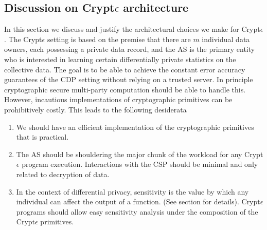 \subsection{Discussion on Crypt$\epsilon$ architecture}
In this section we discuss and justify the architectural choices we make for Crypt$\epsilon$. The Crypt$\epsilon$ setting is based on the premise that there are $m$ individual data owners, each possessing a private data record, and the \textsf{AS} is the primary entity who is interested in learning certain differentially private statistics on the collective data. The goal is to be able to achieve the constant error accuracy guarantees of the \textsf{CDP} setting without relying on a trusted server. In principle cryptographic secure multi-party computation should be able to handle this. However, incautious implementations of cryptographic primitives can be prohibitively costly. This leads to the following desiderata
\begin{enumerate}\item We should have an efficient implementation of the cryptographic primitives that is practical. \item The \textsf{AS} should be shouldering the major chunk of the workload for any Crypt$\epsilon$ program execution. Interactions with the \textsf{CSP} should be minimal and only related to decryption of data. \item In the context of differential privacy, sensitivity is the value by which any individual can affect the output of a function. (See section for details). Crypt$\epsilon$ programs should allow easy sensitivity analysis under the composition of the Crypt$\epsilon$ primitives. \end{enumerate}  

